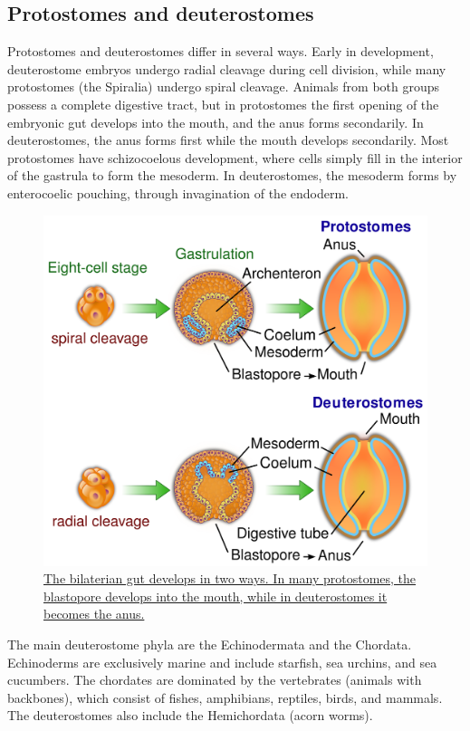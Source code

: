 \twocolumn

\hypertarget{protostomes-and-deuterostomes}{%
\subsection{Protostomes and deuterostomes}\label{protostomes-and-deuterostomes}}

Protostomes and deuterostomes differ in several ways. Early in development, deuterostome embryos undergo radial cleavage during cell division, while many protostomes (the Spiralia) undergo spiral cleavage. Animals from both groups possess a complete digestive tract, but in protostomes the first opening of the embryonic gut develops into the mouth, and the anus forms secondarily. In deuterostomes, the anus forms first while the mouth develops secondarily. Most protostomes have schizocoelous development, where cells simply fill in the interior of the gastrula to form the mesoderm. In deuterostomes, the mesoderm forms by enterocoelic pouching, through invagination of the endoderm.



\begin{figure}

{\centering \includegraphics[width=0.7\linewidth]{./figures/animals/Protovsdeuterostomes} 

}

\caption{\href{https://commons.wikimedia.org/wiki/File:Protovsdeuterostomes.svg}{The bilaterian gut develops in two ways. In many protostomes, the blastopore develops into the mouth, while in deuterostomes it becomes the anus.}}\label{fig:protovsdeutero}
\end{figure}

The main deuterostome phyla are the Echinodermata and the Chordata. Echinoderms are exclusively marine and include starfish, sea urchins, and sea cucumbers. The chordates are dominated by the vertebrates (animals with backbones), which consist of fishes, amphibians, reptiles, birds, and mammals. The deuterostomes also include the Hemichordata (acorn worms).

